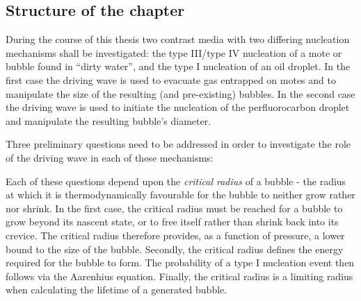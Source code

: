 \subsection{Structure of the chapter}


During the course of this thesis two contrast media with two differing nucleation mechanisms shall be investigated:
the type III/type IV nucleation of a mote or bubble found in ``dirty water'',
and the type I nucleation of an oil droplet.
In the first case the driving wave is used to evacuate gas entrapped on motes
and to manipulate the size of the resulting (and pre-existing) bubbles.
In the second case the driving wave is used to initiate the nucleation of the perfluorocarbon droplet
and manipulate the resulting bubble's diameter.

Three preliminary questions need to be addressed in order to investigate the role of the driving wave in each of these mechanisms:

Each of these questions depend upon the  {\em critical radius} of a bubble - the radius at which it is thermodynamically favourable for the bubble to neither grow rather nor shrink.
In the first case, the critical radius must be reached for a bubble to grow beyond its nascent state, 
or to free itself rather than shrink back into its crevice.  
The critical radius therefore provides, as a function of pressure,  a lower bound to the size of the bubble.
Secondly, the critical radius defines the energy required for the bubble to form.
The probability of a type I nucleation event then follows via the Aarenhius equation.
Finally, the critical radius is a limiting radius when calculating the lifetime of a generated bubble. %


